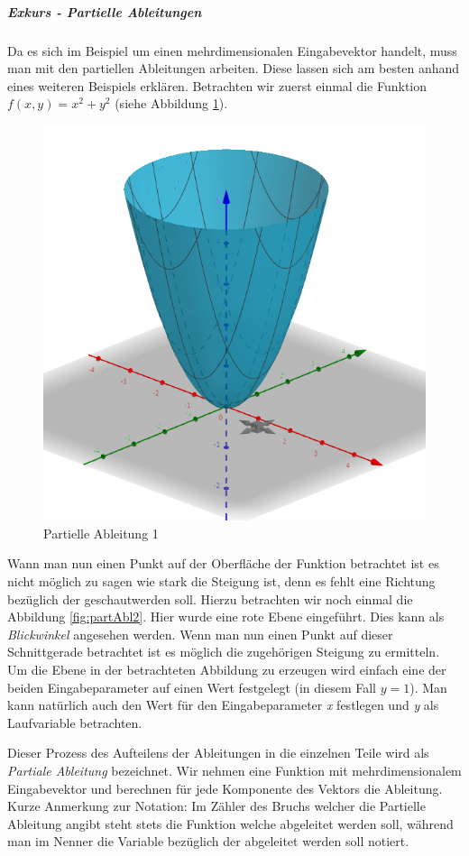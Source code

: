 \subparagraph{Exkurs - Partielle Ableitungen \cite{partAbl}}
Da es sich im Beispiel um einen mehrdimensionalen Eingabevektor handelt, muss man mit den partiellen Ableitungen arbeiten. Diese lassen sich am besten anhand eines weiteren Beispiels erklären. Betrachten wir zuerst einmal die Funktion ${{f(x, y) = x^2 + y^2}}$ (siehe Abbildung \ref{fig:partAbl1}). 

\begin{figure}[!htb]
	\centering
	\includegraphics[width=.6\linewidth]{img/partAbl_1}
	\caption[Partielle Ableitung 1]{Partielle Ableitung 1 \protect\footnotemark}
	\label{fig:partAbl1}
\end{figure}

\FloatBarrier
{}

Wann man nun einen Punkt auf der Oberfläche der Funktion betrachtet ist es nicht möglich zu sagen wie stark die Steigung ist, denn es fehlt eine Richtung bezüglich der \glqq geschaut\grqq  werden soll. Hierzu betrachten wir noch einmal die Abbildung \ref{fig:partAbl2}. Hier wurde eine \glqq rote Ebene \glqq eingeführt. Dies kann als \emph{Blickwinkel} angesehen werden. Wenn man nun einen Punkt auf dieser Schnittgerade betrachtet ist es möglich die zugehörigen Steigung zu ermitteln. Um die Ebene in der betrachteten Abbildung zu erzeugen wird einfach eine der beiden Eingabeparameter auf einen Wert festgelegt (in diesem Fall ${y=1}$). Man kann natürlich auch den Wert für den Eingabeparameter \emph{x} festlegen und \emph{y} als Laufvariable betrachten. 

Dieser Prozess des Aufteilens der Ableitungen in die einzelnen Teile wird als \emph{Partiale Ableitung} bezeichnet. Wir nehmen eine Funktion mit mehrdimensionalem Eingabevektor und berechnen für jede Komponente des Vektors die Ableitung. Kurze Anmerkung zur Notation: Im Zähler des Bruchs welcher die Partielle Ableitung angibt steht stets die Funktion welche abgeleitet werden soll, während man im Nenner die Variable bezüglich der abgeleitet werden soll notiert.


